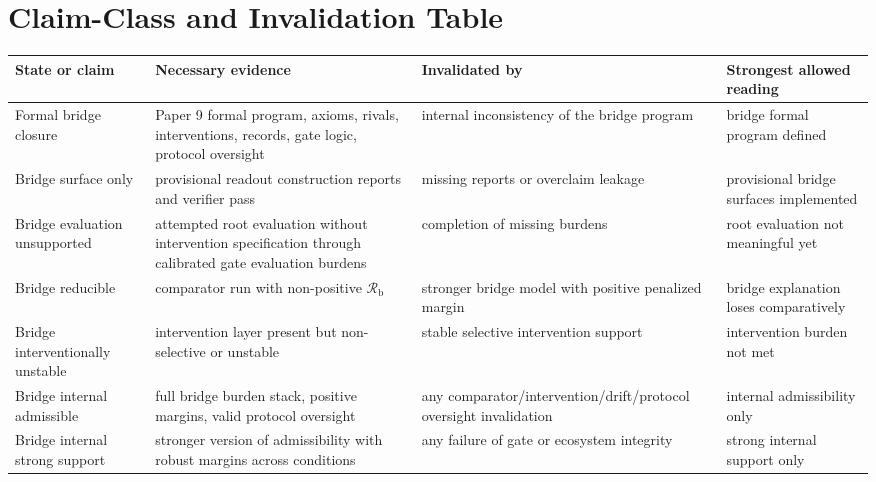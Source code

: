 \documentclass[11pt,a4paper]{article}
\theoremstyle{definition}
\newcommand{\BridgeMargin}{\mathcal{R}_{\mathrm{b}}}
\begin{document}
\section{Claim-Class and Invalidation Table}
\begin{center}
\small
\begin{tabularx}{\linewidth}{@{}>{\raggedright\arraybackslash}p{}>{\raggedright\arraybackslash}p{}>{\raggedright\arraybackslash}p{}>{\raggedright\arraybackslash}p{}@{}}
\toprule
State or claim & Necessary evidence & Invalidated by & Strongest allowed reading \\
\midrule
Formal bridge closure & Paper 9 formal program, axioms, rivals, interventions, records, gate logic, protocol oversight & internal inconsistency of the bridge program & bridge formal program defined \\
Bridge surface only & provisional readout construction reports and verifier pass & missing reports or overclaim leakage & provisional bridge surfaces implemented \\
Bridge evaluation unsupported & attempted root evaluation without intervention specification through calibrated gate evaluation burdens & completion of missing burdens & root evaluation not meaningful yet \\
Bridge reducible & comparator run with non-positive $\BridgeMargin$ & stronger bridge model with positive penalized margin & bridge explanation loses comparatively \\
Bridge interventionally unstable & intervention layer present but non-selective or unstable & stable selective intervention support & intervention burden not met \\
Bridge internal admissible & full bridge burden stack, positive margins, valid protocol oversight & any comparator/\allowbreak intervention/\allowbreak drift/\allowbreak protocol oversight invalidation & internal admissibility only \\
Bridge internal strong support & stronger version of admissibility with robust margins across conditions & any failure of gate or ecosystem integrity & strong internal support only \\
\bottomrule
\end{tabularx}
\end{center}
\end{document}

